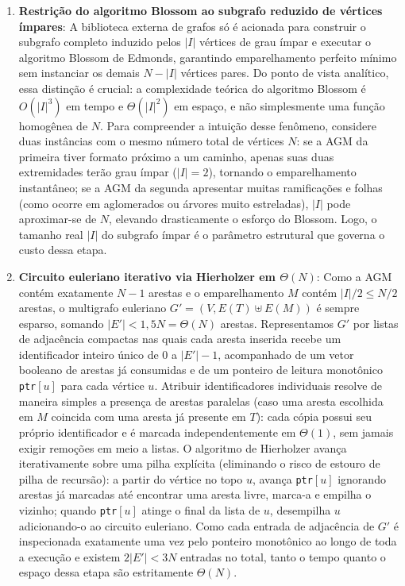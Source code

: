 \begin{enumerate}
  \item \textbf{Restrição do algoritmo Blossom ao subgrafo reduzido de vértices ímpares}:
  A biblioteca externa de grafos só é acionada para construir o subgrafo completo induzido pelos
  $|I|$ vértices de grau ímpar e executar o algoritmo Blossom de Edmonds, garantindo
  emparelhamento perfeito mínimo sem instanciar os demais $N - |I|$ vértices pares. Do ponto de
  vista analítico, essa distinção é crucial: a complexidade teórica do algoritmo Blossom é
  $O(|I|^3)$ em tempo e $\Theta(|I|^2)$ em espaço, e não simplesmente uma função homogênea de
  $N$. Para compreender a intuição desse fenômeno, considere duas instâncias com o mesmo número
  total de vértices $N$: se a AGM da primeira tiver formato próximo a um caminho, apenas suas
  duas extremidades terão grau ímpar ($|I| = 2$), tornando o emparelhamento instantâneo; se a
  AGM da segunda apresentar muitas ramificações e folhas (como ocorre em aglomerados ou árvores
  muito estreladas), $|I|$ pode aproximar-se de $N$, elevando drasticamente o esforço do
  Blossom. Logo, o tamanho real $|I|$ do subgrafo ímpar é o parâmetro estrutural que governa o
  custo dessa etapa.

  \item \textbf{Circuito euleriano iterativo via Hierholzer em $\Theta(N)$}:
  Como a AGM contém exatamente $N - 1$ arestas e o emparelhamento $M$ contém $|I|/2 \le N/2$
  arestas, o multigrafo euleriano $G' = (V, E(T) \uplus E(M))$ é sempre esparso, somando
  $|E'| < 1{,}5N = \Theta(N)$ arestas. Representamos $G'$ por listas de adjacência compactas
  nas quais cada aresta inserida recebe um identificador inteiro único de $0$ a $|E'| - 1$,
  acompanhado de um vetor booleano de arestas já consumidas e de um ponteiro de leitura
  monotônico \texttt{ptr}$[u]$ para cada vértice $u$. Atribuir identificadores individuais
  resolve de maneira simples a presença de arestas paralelas (caso uma aresta escolhida em $M$
  coincida com uma aresta já presente em $T$): cada cópia possui seu próprio identificador e é
  marcada independentemente em $\Theta(1)$, sem jamais exigir remoções em meio a listas. O
  algoritmo de Hierholzer avança iterativamente sobre uma pilha explícita (eliminando o risco de
  estouro de pilha de recursão): a partir do vértice no topo $u$, avança \texttt{ptr}$[u]$
  ignorando arestas já marcadas até encontrar uma aresta livre, marca-a e empilha o vizinho;
  quando \texttt{ptr}$[u]$ atinge o final da lista de $u$, desempilha $u$ adicionando-o ao
  circuito euleriano. Como cada entrada de adjacência de $G'$ é inspecionada exatamente uma vez
  pelo ponteiro monotônico ao longo de toda a execução e existem $2|E'| < 3N$ entradas no
  total, tanto o tempo quanto o espaço dessa etapa são estritamente $\Theta(N)$.
\end{enumerate}

